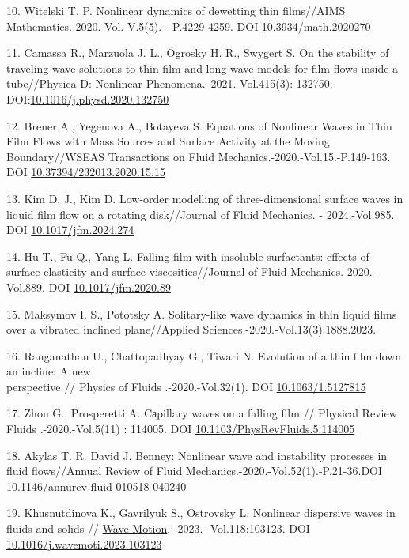 \begin{references}
10. Witelski T. P. Nonlinear dynamics of dewetting thin films//AIMS
Mathematics.-2020.-Vol. V.5(5). - P.4229-4259. DOI
\href{http://dx.doi.org/10.3934/math.2020270}{10.3934/math.2020270}

11. Camassa R., Marzuola J. L., Ogrosky H. R., Swygert S. On the
stability of traveling wave solutions to thin-film and long-wave models
for film flows inside a tube//Physica D: Nonlinear
Phenomena.--2021.-Vol.415(3): 132750.
DOI:\href{http://dx.doi.org/10.1016/j.physd.2020.132750}{10.1016/j.physd.2020.132750}

12. Brener A., Yegenova A., Botayeva S. Equations of Nonlinear Waves in
Thin Film Flows with Mass Sources and Surface Activity at the Moving
Boundary//WSEAS Transactions on Fluid
Mechanics.-2020.-Vol.15.-P.149-163. DOI
\href{http://dx.doi.org/10.37394/232013.2020.15.15}{10.37394/232013.2020.15.15}

13. Kim D. J., Kim D. Low-order modelling of three-dimensional surface
waves in liquid film flow on a rotating disk//Journal of Fluid
Mechanics. - 2024.-Vol.985. DOI
\href{http://dx.doi.org/10.1017/jfm.2024.274}{10.1017/jfm.2024.274}

14. Hu T., Fu Q., Yang L. Falling film with insoluble surfactants:
effects of surface elasticity and surface viscosities//Journal of Fluid
Mechanics.-2020.-Vol.889. DOI
\href{http://dx.doi.org/10.1017/jfm.2020.89}{10.1017/jfm.2020.89}

15. Maksymov I. S., Pototsky A. Solitary-like wave dynamics in thin
liquid films over a vibrated inclined plane//Applied
Sciences.-2020.-Vol.13(3):1888.2023.
\href{https://doi.org/10.3390/app13031888}{}

16. Ranganathan U., Chattopadhyay G., Tiwari N. Evolution of a thin film
down an incline: A new \\perspective // Physics of Fluids .-2020.-Vol.32(1).
DOI \href{http://dx.doi.org/10.1063/1.5127815}{10.1063/1.5127815}

17. Zhou G., Prosperetti A. Cаpillary waves on a falling film // Physical
Review Fluids .-2020.-Vol.5(11) : 114005. DOI
\href{http://dx.doi.org/10.1103/PhysRevFluids.5.114005}{10.1103/PhysRevFluids.5.114005}

18. Akylas T. R. David J. Benney: Nonlinear wave and instability
processes in fluid flows//Annual Review of Fluid
Mechanics.-2020.-Vol.52(1).-P.21-36.DOI
\href{http://dx.doi.org/10.1146/annurev-fluid-010518-040240}{10.1146/annurev-fluid-010518-040240}

19. Khusnutdinova K., Gavrilyuk S., Ostrovsky L. Nonlinear dispersive
waves in fluids and solids //
\href{https://www.researchgate.net/journal/Wave-Motion-0165-2125?_tp=eyJjb250ZXh0Ijp7ImZpcnN0UGFnZSI6InB1YmxpY2F0aW9uIiwicGFnZSI6InB1YmxpY2F0aW9uIn19}{Wave
Motion}.- 2023.- Vol.118:103123. DOI
\href{http://dx.doi.org/10.1016/j.wavemoti.2023.103123}{10.1016/j.wavemoti.2023.103123}


\end{references}
